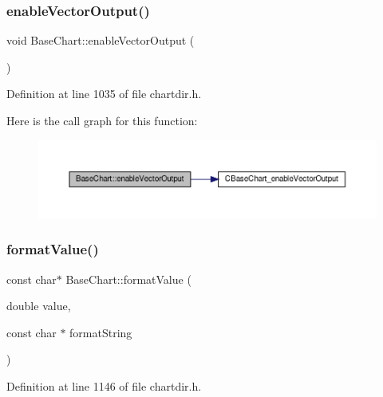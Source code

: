 \subsubsection{\texorpdfstring{enable\+Vector\+Output()}{enableVectorOutput()}}
{\footnotesize\ttfamily void Base\+Chart\+::enable\+Vector\+Output (\begin{DoxyParamCaption}{ }\end{DoxyParamCaption})\hspace{0.3cm}{\ttfamily [inline]}}



Definition at line 1035 of file chartdir.\+h.

Here is the call graph for this function\+:
\nopagebreak
\begin{figure}[H]
\begin{center}
\leavevmode
\includegraphics[width=350pt]{class_base_chart_ae67229acd792aee7a5b73ac258c6de3f_cgraph}
\end{center}
\end{figure}
\mbox{\label{class_base_chart_a4d416306451019458d6de5dbc3dd952f}} 
\subsubsection{\texorpdfstring{format\+Value()}{formatValue()}}
{\footnotesize\ttfamily const char$\ast$ Base\+Chart\+::format\+Value (\begin{DoxyParamCaption}\item[{double}]{value,  }\item[{const char $\ast$}]{format\+String }\end{DoxyParamCaption})\hspace{0.3cm}{\ttfamily [inline]}}



Definition at line 1146 of file chartdir.\+h.

